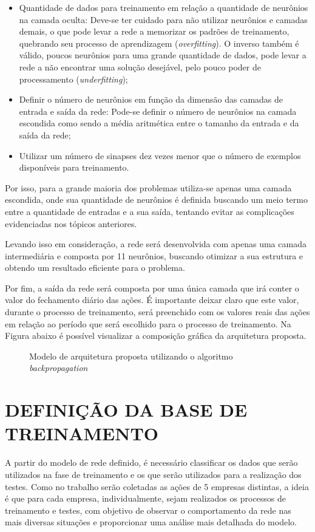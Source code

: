 \begin{itemize}
\item Quantidade de dados para treinamento em relação a quantidade de neurônios na camada oculta: Deve-se ter cuidado para não utilizar neurônios e camadas demais, o que pode levar a rede a memorizar os padrões de treinamento, quebrando seu processo de aprendizagem (\textit{overfitting}). O inverso também é válido, poucos neurônios para uma grande quantidade de dados, pode levar a rede a não encontrar uma solução desejável, pelo pouco poder de processamento (\textit{underfitting});
\item Definir o número de neurônios em função da dimensão das camadas de entrada e saída da rede: Pode-se definir o número de neurônios na camada escondida como sendo a média aritmética entre o tamanho da entrada e da saída da rede;
\item Utilizar um número de sinapses dez vezes menor que o número de exemplos disponíveis para treinamento.
\end{itemize}

Por isso, para a grande maioria dos problemas utiliza-se apenas uma camada escondida, onde sua quantidade de neurônios é definida buscando um meio termo entre a quantidade de entradas e a sua saída, tentando evitar as complicações evidenciadas nos tópicos anteriores.

Levando isso em consideração, a rede será desenvolvida com apenas uma camada intermediária e composta por 11 neurônios, buscando otimizar a sua estrutura e obtendo um resultado eficiente para o problema.

Por fim, a saída da rede será composta por uma única camada que irá conter o valor do fechamento diário das ações. É importante deixar claro que este valor, durante o processo de treinamento, será preenchido com os valores reais das ações em relação ao período que será escolhido para o processo de treinamento. Na Figura abaixo é possível visualizar a composição gráfica da arquitetura proposta.

\begin{figure}[h]
	\centering
	\caption{Modelo de arquitetura proposta utilizando o algoritmo \textit{backpropagation}}
	\label{exec-rna}
\end{figure}

\section{DEFINIÇÃO DA BASE DE TREINAMENTO}
A partir do modelo de rede definido, é necessário classificar os dados que serão utilizados na fase de treinamento e os que serão utilizados para a realização dos testes. Como no trabalho serão coletadas as ações de 5 empresas distintas, a ideia é que para cada empresa, individualmente, sejam realizados os processos de treinamento e testes, com objetivo de observar o comportamento da rede nas mais diversas situações e proporcionar uma análise mais detalhada do modelo.

